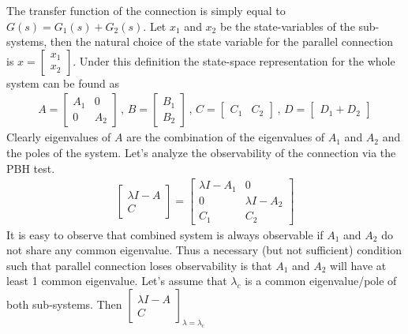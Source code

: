 \documentclass[twoside]{article}
\begin{document}
The transfer function of the connection is simply equal to $G(s) = G_1(s) + G_2(s)$. Let $x_1$ and $x_2$
be the state-variables of the sub-systems, then the natural choice of the state variable for the parallel connection is 
$x = \begin{bmatrix} x_1 \\ x_2 \end{bmatrix}$. Under this definition the state-space representation for the whole system 
can be found as
%
\begin{align*}
A = \left[ \begin{array}{c|c} A_1 & 0 \\ \hline 0  & A_2 \end{array} \right]
\, , \, B = \left[ \begin{array}{c} B_1 \\ \hline B_2   \end{array} \right]
\, , \, C = \left[ \begin{array}{c|c} C_1 & C_2  \end{array} \right]
\, , \, D = \left[ \begin{array}{c} D_1 +  D_2  \end{array} \right]
\end{align*}
%
Clearly eigenvalues of $A$ are the combination of the eigenvalues of $A_1$ and $A_2$ and the poles of the system.
Let's analyze the observability of the connection via the PBH test. 
%
\begin{align*}
	\left[ \begin{array}{c} \lambda I - A \\ \hline C \end{array} \right]
	= 
	\left[ \begin{array}{c|c} \lambda I - A_1 & 0 \\ \hline 0 &  \lambda I - A_2 \\ \hline 
	 C_1 & C_2
	\end{array} \right]
\end{align*}
%
It is easy to observe that combined system is always observable if $A_1$ 
and $A_2$ do not share any common eigenvalue. Thus a necessary (but not sufficient) condition 
such that parallel connection loses observability is that $A_1$ and $A_2$ will have at least 1 
common eigenvalue. Let's assume that $\lambda_c$ is a common eigenvalue/pole of both sub-systems.
Then $\left[ \begin{array}{c} \lambda I - A \\ \hline C \end{array} \right]_{\lambda = \lambda_c}$ 
\end{document}

